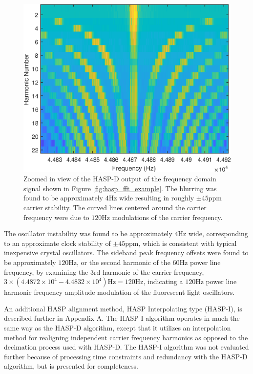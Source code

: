 \begin{figure}[tp]
	\includegraphics[width=\textwidth]{./dasp_algorithm_results/hasp_d_zoom_filenum_9601.eps}
	\centering
	\caption{Zoomed in view of the HASP-D output of the frequency domain signal shown in Figure \ref{fig:hasp_fft_example}.  The blurring was found to be approximately $4$Hz wide resulting in roughly $\pm 45$ppm carrier stability.  The curved lines centered around the carrier frequency were due to $120$Hz modulations of the carrier frequency.}
	\label{fig:haspd_example_zoom}
\end{figure}

The oscillator instability was found to be approximately $4$Hz wide, corresponding to an approximate clock stability of $\pm 45$ppm, which is consistent with typical inexpensive crystal oscillators.  The sideband peak frequency offsets were found to be approximately $120$Hz, or the second harmonic of the $60$Hz power line frequency, by examining the $3$rd harmonic of the carrier frequency, $3 \times (4.4872\times10^4 - 4.4832\times10^4)$Hz$ = 120$Hz, indicating a $120$Hz power line harmonic frequency amplitude modulation of the fluorescent light oscillators.

An additional HASP alignment method, HASP Interpolating type (HASP-I), is described further in Appendix A.  The HASP-I algorithm operates in much the same way as the HASP-D algorithm, except that it utilizes an interpolation method for realigning independent carrier frequency harmonics as opposed to the decimation process used with HASP-D.  The HASP-I algorithm was not evaluated further because of processing time constraints and redundancy with the HASP-D algorithm, but is presented for completeness.    

